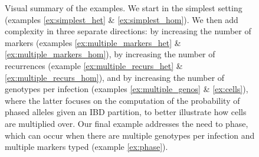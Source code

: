 \documentclass{article}
\begin{document}
\begin{figure}[H]
    \begin{center}

\end{center}
    \caption{Visual summary of the examples. We start in the simplest setting (examples \ref{ex:simplest_het} \& \ref{ex:simplest_hom}). We then add complexity in three separate directions: by increasing the number of markers (examples \ref{ex:multiple_markers_het} \& \ref{ex:multiple_markers_hom}), by increasing the number of recurrences (example \ref{ex:multiple_recurs_het} \& \ref{ex:multiple_recurs_hom}), and by increasing the number of genotypes per infection (examples \ref{ex:multiple_genos} \& \ref{ex:cells}), where the latter focuses on the computation of the probability of phased alleles given an IBD partition, to better illustrate how cells are multiplied over. Our final example addresses the need to phase, which can occur when there are multiple genotypes per infection and multiple markers typed (example \ref{ex:phase}).}
    \label{fig:my_label}
\end{figure}






\end{document}
